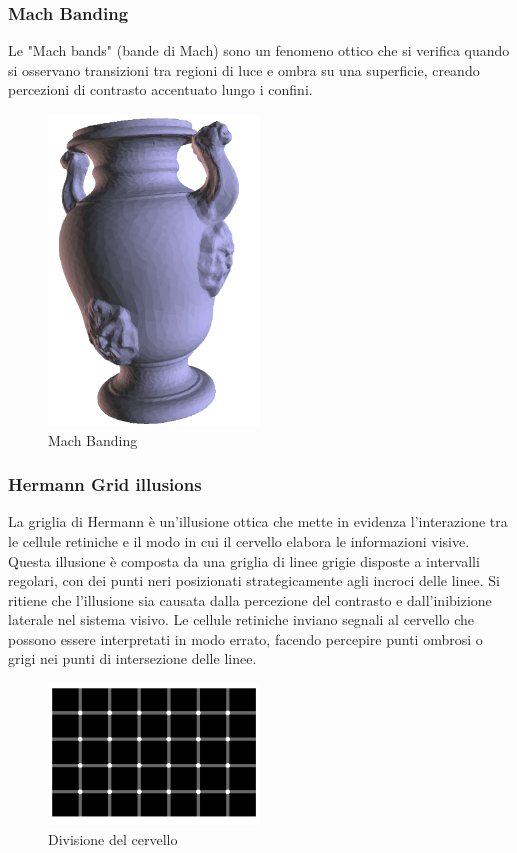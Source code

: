 \subsubsection{Mach Banding}
Le "Mach bands" (bande di Mach) sono un fenomeno ottico che si verifica quando si osservano transizioni tra regioni di luce e ombra su una superficie, creando 
percezioni di contrasto accentuato lungo i confini.
\begin{figure}[H]
    \centering
    \includegraphics[width=0.5\textwidth]{images/MachBand.png} 
    \caption{Mach Banding}
    \label{fig:immagine}
\end{figure}
\subsubsection{Hermann Grid illusions}

La griglia di Hermann è un'illusione ottica che mette in evidenza l'interazione tra le cellule retiniche e il modo in cui il cervello elabora le informazioni visive. Questa illusione è composta da una griglia di linee grigie disposte a intervalli regolari, 
con dei punti neri posizionati strategicamente agli incroci delle linee.
Si ritiene che l'illusione sia causata dalla percezione del contrasto e dall'inibizione laterale nel sistema visivo. Le cellule retiniche inviano segnali al cervello che possono essere interpretati in modo errato, 
facendo percepire punti ombrosi o grigi nei punti di intersezione delle linee.
\begin{figure}[H]
    \centering
    \includegraphics[width=0.5\textwidth]{images/HermmanG.png} 
    \caption{Divisione del cervello}
    \label{fig:immagine}
\end{figure}
